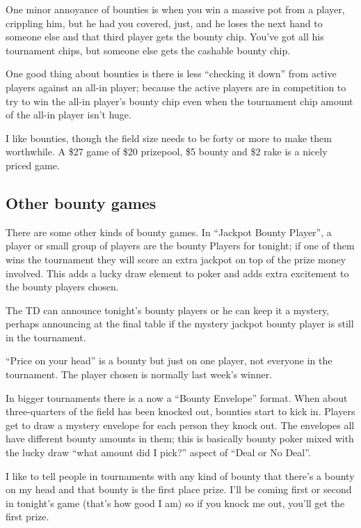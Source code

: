 One minor annoyance of bounties is when you win a massive pot
from a player, crippling him, but he had you covered, just, and
he loses the next hand to someone else and that third player gets the
bounty chip. You've got all his tournament chips, but someone
else gets the cashable bounty chip.

One good thing about bounties is there is less ``checking it down''
from active players against an all-in player; because the active
players are in competition to try to win the all-in player's
bounty chip even when the tournament chip amount of the all-in player
isn't huge.

I like bounties, though the field size needs to be forty or more to
make them worthwhile. A \$27 game of \$20 prizepool, \$5 bounty
and \$2 rake is a nicely priced game.

\subsection{Other bounty games}

There are some other kinds of bounty games. In ``Jackpot Bounty
Player'', a player or small group of players are the
bounty Players for tonight; if one of them wins
the tournament they will score an extra jackpot on top of
the prize money involved. This adds a lucky draw element to
poker and adds extra excitement to the bounty players chosen.

The TD can announce tonight's bounty players or he can keep it a
mystery, perhaps announcing at the final table if the mystery jackpot
bounty player is still in the tournament.

``Price on your head'' is a bounty but just on one player, not
everyone in the tournament. The player chosen is normally last week's
winner.

In bigger tournaments there is a now a ``Bounty Envelope'' format.
When about three-quarters of the field has been knocked out, bounties
start to kick in. Players get to draw a mystery envelope for each
person they knock out. The envelopes all have different bounty amounts
in them; this is basically bounty poker mixed with the lucky draw
``what amount did I pick?'' aspect of ``Deal or No Deal''.

I like to tell people in tournaments with any kind of bounty
that there's a bounty on my head and that bounty is the first
place prize. I'll be coming first or second in tonight's game (that's
how good I am) so if you knock me out, you'll get the first prize.

